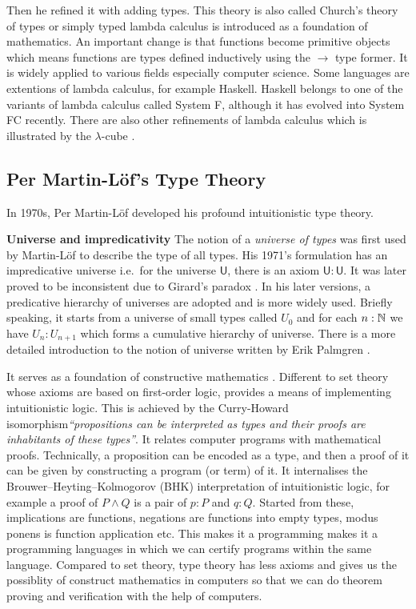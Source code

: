 Then he refined it with adding types. This theory is also called
Church's theory of types or simply typed lambda calculus is
introduced as a foundation of mathematics. An important change is that functions become primitive objects which means functions are types defined inductively using the $\rightarrow$ type former. It is widely applied to
various fields especially computer science. Some languages are extentions of lambda calculus, for example Haskell. Haskell belongs to one of the variants of lambda calculus called System F, although it has evolved into System FC recently. There are also other refinements of lambda calculus which is illustrated by the $\lambda$-cube \cite{barendregt1991introduction}.



\subsection{Per Martin-L\"{o}f's Type Theory}

In 1970s, Per Martin-L\"{o}f \cite{per:71,per:82}  developed his profound intuitionistic type theory. 


\textbf{Universe and impredicativity} The notion of a \emph{universe of types}  was first used by Martin-L\"{o}f \cite{Martin-Lof-1973} to describe the type of all types. 
His 1971's formulation has an impredicative universe i.e.\ for the universe $\mathsf{U}$, there is an axiom $\mathsf{U} : \mathsf{U}$. 
It was later proved to be inconsistent due to Girard's paradox \cite{hurkens1995simplification}.
In his later versions, a predicative hierarchy of universes are adopted and is more widely used. Briefly speaking, it starts from a universe of small types called $U_0$ and for each $n : \mathbb{N}$ we have $U_n : U_{n+1}$ which forms a cumulative hierarchy of universe. There is a more detailed introduction to the notion of universe written by Erik Palmgren \cite{Palmgren98onuniverses}.



It serves as a foundation of constructive mathematics \cite{martin1984intuitionistic}. Different to set theory whose axioms are based on first-order logic, \mltt provides a means of implementing intuitionistic logic. This is achieved by the Curry-Howard
isomorphism\emph{``propositions can be interpreted as types and their
  proofs are inhabitants of these types''}. It relates computer programs with mathematical proofs. Technically, a proposition can be encoded as a type, and then a proof of it can be given by constructing a program (or term) of it. It internalises the  Brouwer–Heyting–Kolmogorov (BHK) interpretation of intuitionistic logic, for example a proof of $P \wedge Q$ is a pair of $p : P$ and $q : Q$.
Started from these, implications are functions, negations are functions into empty types, modus ponens is function application etc. This makes it a programming makes it a programming languages in which we can certify programs within the same language.
Compared to set theory, type theory has less axioms and gives us the possiblity of construct mathematics in computers so that we can do theorem proving and verification with the help of computers.


